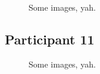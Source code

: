 \lipsum[1]

\clearpage

\begin{figure}[h]
	\caption{Some images, yah.}
\end{figure}

\lipsum[1]


\clearpage

\subsection{Participant 11}

\begin{figure}[h]
	\caption{Some images, yah.}
\end{figure}

